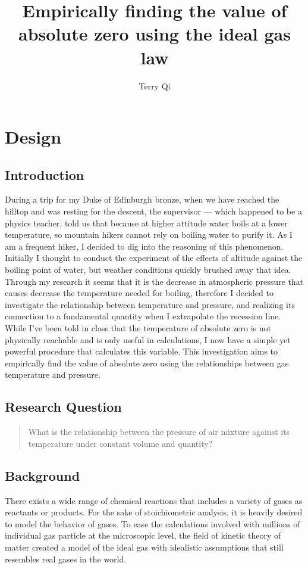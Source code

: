 \documentclass[a4paper,12pt]{article}
\title{Empirically finding the value of absolute zero using the ideal gas law}
\author{Terry Qi}
\begin{document}
\maketitle

\section{Design}
\subsection{Introduction}

During a trip for my Duke of Edinburgh bronze, when we have reached the hilltop and was resting for the descent, the supervisor --- which happened to be a physics teacher, told us that because at higher attitude water boils at a lower temperature, so mountain hikers cannot rely on boiling water to purify it. As I am a frequent hiker, I decided to dig into the reasoning of this phenomenon. Initially I thought to conduct the experiment of the effects of altitude against the boiling point of water, but weather conditions quickly brushed away that idea. Through my research it seems that it is the decrease in atmospheric pressure that causes decrease the temperature needed for boiling, therefore I decided to investigate the relationship between temperature and pressure, and realizing its connection to a fundamental quantity when I extrapolate the recession line. While I've been told in class that the temperature of absolute zero is not physically reachable and is only useful in calculations, I now have a simple yet powerful procedure that calculates this variable. This investigation aims to empirically find the value of absolute zero using the relationships between gas temperature and pressure.


\subsection{Research Question}
\begin{quote}
    What is the relationship between the pressure of air mixture against its temperature under constant volume and quantity?
\end{quote}

\subsection{Background}
There exists a wide range of chemical reactions that includes a variety of gases as reactants or products. For the sake of stoichiometric analysis, it is heavily desired to model the behavior of gases. To ease the calculations involved with millions of individual gas particle at the microscopic level, the field of kinetic theory of matter created a model of the ideal gas with idealistic assumptions that still resembles real gases in the world.
\end{document}
